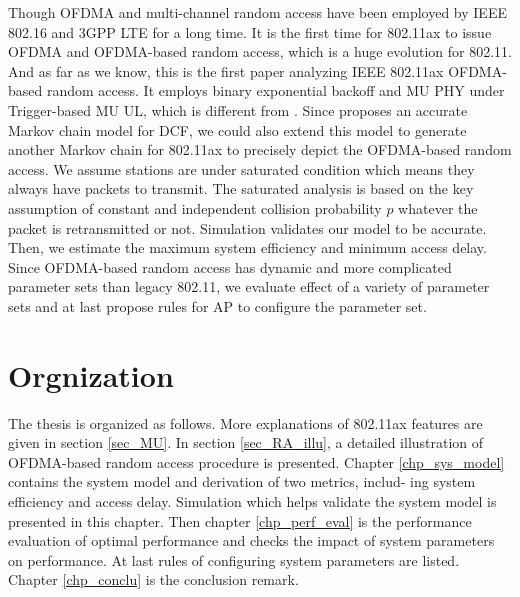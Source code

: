Though OFDMA and multi-channel random access have been employed by IEEE 802.16 and 3GPP LTE for a long time.
It is the first time for 802.11ax to issue OFDMA and OFDMA-based random access, which is a huge evolution for 802.11.
And as far as we know, this is the first paper analyzing IEEE 802.11ax OFDMA-based random access. 
It employs binary exponential backoff and MU PHY under Trigger-based MU UL, which is different from \cite{GeneralizedOFDMACSMACA}.
Since \cite{bianchi2000performance} proposes an accurate Markov chain model for DCF, we could also extend this model to generate another Markov chain for 802.11ax to precisely depict the OFDMA-based random access.
We assume stations are under saturated condition which means they always have packets to transmit.
The saturated analysis is based on the key assumption of constant and independent collision probability $p$ whatever the packet is retransmitted or not.
Simulation validates our model to be accurate.
Then, we estimate the maximum system efficiency and minimum access delay. 
Since OFDMA-based random access has dynamic and more complicated parameter sets than legacy 802.11, we evaluate effect of a variety of parameter sets and at last propose rules for AP to configure the parameter set. 


\section{Orgnization}

The thesis is organized as follows. 
More explanations of 802.11ax features are given in section \ref{sec_MU}. In section \ref{sec_RA_illu}, a detailed illustration of OFDMA-based random access procedure is presented.
Chapter \ref{chp_sys_model} contains the system model and derivation of two metrics, includ-
ing system efficiency and access delay. 
Simulation which helps validate the system model is presented in this chapter.
Then chapter \ref{chp_perf_eval} is the performance evaluation of optimal performance and checks the impact of system parameters on performance.
At last rules of configuring system parameters are listed.
Chapter \ref{chp_conclu} is the conclusion remark.

%
%
%
